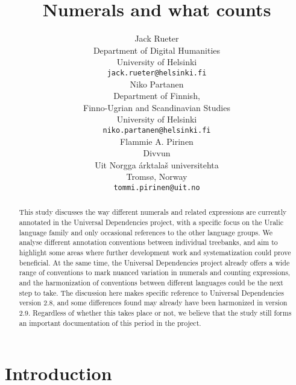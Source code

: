 \documentclass[free]{flammie}
\title{Numerals and what
counts\footnotepubrights{\aclanthologypostprintdoi{2021.udw-1.13}}}
\author{Jack Rueter \\
  Department of Digital Humanities \\
  University of Helsinki \\
  {\tt jack.rueter@helsinki.fi} \\
  Niko Partanen \\
  Department of Finnish, \\Finno-Ugrian and Scandinavian Studies \\
  University of Helsinki \\
  {\tt niko.partanen@helsinki.fi} \\
  Flammie A. Pirinen \\
  Divvun \\
  Uit Norgga árktalaš universitehta \\
  Tromsø, Norway \\
  {\tt tommi.pirinen@uit.no} \\}
\date{}
\begin{document}
\maketitle
\begin{abstract}
  This study discusses the way different numerals and related expressions are
    currently annotated in the Universal Dependencies project, with a specific
    focus on the Uralic language family and only occasional references to the
    other language groups.  We analyse different annotation conventions between
    individual treebanks, and aim to highlight some areas where further
    development work and systematization could prove beneficial.  At the same
    time, the Universal Dependencies project already offers a wide range of
    conventions to mark nuanced variation in numerals and counting expressions,
    and the harmonization of conventions between different languages could be
    the next step to take.  The discussion here makes  specific reference to
    Universal Dependencies version 2.8, and some differences found may already
    have been harmonized in version 2.9.  Regardless of whether this takes place
    or not, we believe that the study still forms an important documentation of
    this period in the project.
\end{abstract}


\section{Introduction}\label{intro}
\end{document}
